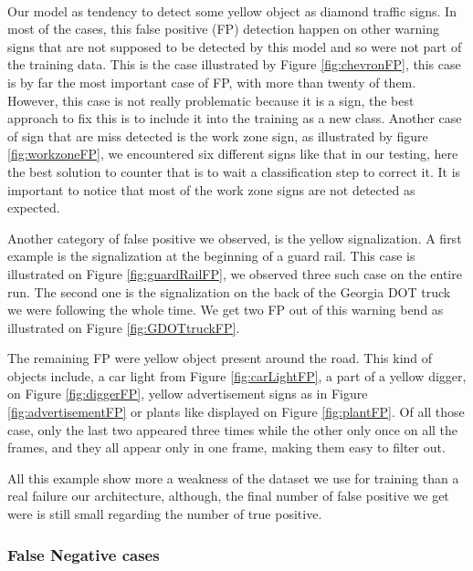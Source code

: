 \paragraph{}
Our model as tendency to detect some yellow object as diamond traffic signs. In most of the cases, this false positive (FP) detection happen on other warning signs that are not supposed to be detected by this model and so were not part of the training data. This is the case illustrated by Figure \ref{fig:chevronFP}, this case is by far the most important case of FP, with more than twenty of them. However, this case is not really problematic because it is a sign, the best approach to fix this is to include it into the training as a new class. Another case of sign that are miss detected is the work zone sign, as illustrated by figure \ref{fig:workzoneFP}, we encountered six different signs like that in our testing, here the best solution to counter that is to wait a classification step to correct it. It is important to notice that most of the work zone signs are not detected as expected.

Another category of false positive we observed, is the yellow signalization. A first example is the signalization at the beginning of a guard rail. This case is illustrated on Figure \ref{fig:guardRailFP}, we observed three such case on the entire run. The second one is the signalization on the back of the Georgia DOT truck we were following the whole time. We get two FP out of this warning bend as illustrated on Figure \ref{fig:GDOTtruckFP}.

The remaining FP were yellow object present around the road. This kind of objects include, a car light from Figure \ref{fig:carLightFP}, a part of a yellow digger, on Figure \ref{fig:diggerFP}, yellow advertisement signs as in Figure \ref{fig:advertisementFP} or plants like displayed on Figure \ref{fig:plantFP}. Of all those case, only the last two appeared three times while the other only once on all the frames, and they all appear only in one frame, making them easy to filter out.

All this example show more a weakness of the dataset we use for training than a real failure our architecture, although, the final number of false positive we get were is still small regarding the number of true positive.

\subsubsection{False Negative cases}

